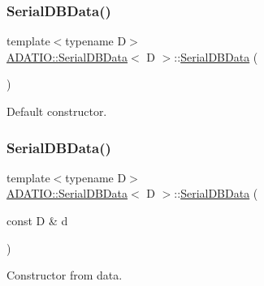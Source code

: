 \subsubsection{\texorpdfstring{SerialDBData()}{SerialDBData()}\hspace{0.1cm}{\footnotesize\ttfamily [4/6]}}
{\footnotesize\ttfamily template$<$typename D$>$ \\
\mbox{\hyperlink{classADATIO_1_1SerialDBData}{A\+D\+A\+T\+I\+O\+::\+Serial\+D\+B\+Data}}$<$ D $>$\+::\mbox{\hyperlink{classADATIO_1_1SerialDBData}{Serial\+D\+B\+Data}} (\begin{DoxyParamCaption}{ }\end{DoxyParamCaption})\hspace{0.3cm}{\ttfamily [inline]}}



Default constructor. 

\mbox{\label{classADATIO_1_1SerialDBData_afe5b91aca4221cfce681c85498a46f0c}} 
\subsubsection{\texorpdfstring{SerialDBData()}{SerialDBData()}\hspace{0.1cm}{\footnotesize\ttfamily [5/6]}}
{\footnotesize\ttfamily template$<$typename D$>$ \\
\mbox{\hyperlink{classADATIO_1_1SerialDBData}{A\+D\+A\+T\+I\+O\+::\+Serial\+D\+B\+Data}}$<$ D $>$\+::\mbox{\hyperlink{classADATIO_1_1SerialDBData}{Serial\+D\+B\+Data}} (\begin{DoxyParamCaption}\item[{const D \&}]{d }\end{DoxyParamCaption})\hspace{0.3cm}{\ttfamily [inline]}}



Constructor from data. 

\mbox{\label{classADATIO_1_1SerialDBData_a740c06f0022817ca9c071d186d7b3e92}} 
